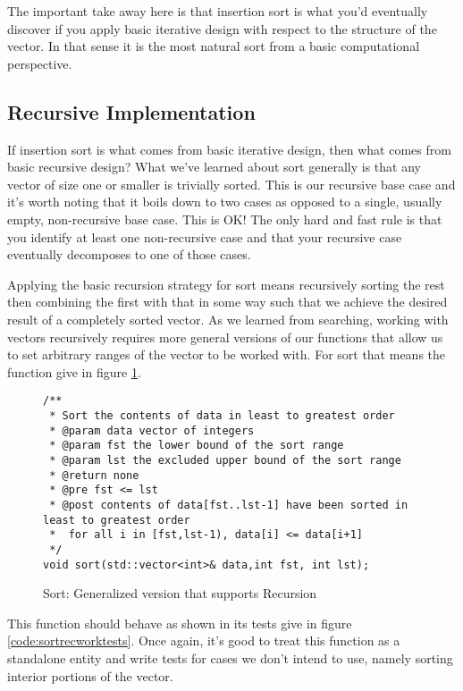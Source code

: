 \documentclass[]{tufte-handout}
\begin{document}
The important take away here is that insertion sort is what you'd eventually discover if you apply basic iterative design with respect to the structure of the vector. In that sense it is the most natural sort from a basic computational perspective.

\subsection{Recursive Implementation}

If insertion sort is what comes from basic iterative design, then what comes from basic recursive design? What we've learned about sort generally is that any vector of size one or smaller is trivially sorted. This is our recursive base case and it's worth noting that it boils down to two cases as opposed to a single, usually empty, non-recursive base case. This is OK! The only hard and fast rule is that you identify at least one non-recursive case and that your recursive case eventually decomposes to one of those cases.

Applying the basic recursion strategy for sort means recursively sorting the rest then combining the first with that in some way such that we achieve the desired result of a completely sorted vector. As we learned from searching, working with vectors recursively requires more general versions of our functions that allow us to set arbitrary ranges of the vector to be worked with. For sort that means the function give in figure \ref{code:sortrecwork}.

\begin{figure}[!htbp]
\begin{lstlisting}
/**
 * Sort the contents of data in least to greatest order
 * @param data vector of integers
 * @param fst the lower bound of the sort range
 * @param lst the excluded upper bound of the sort range
 * @return none
 * @pre fst <= lst
 * @post contents of data[fst..lst-1] have been sorted in least to greatest order
 *  for all i in [fst,lst-1), data[i] <= data[i+1]
 */
void sort(std::vector<int>& data,int fst, int lst);
\end{lstlisting}
\caption{Sort: Generalized version that supports Recursion}
\label{code:sortrecwork}
\end{figure}

This function should behave as shown in its tests give in figure \ref{code:sortrecworktests}. Once again, it's good to treat this function as a standalone entity and write tests for cases we don't intend to use, namely sorting interior portions of the vector.
\end{document}
